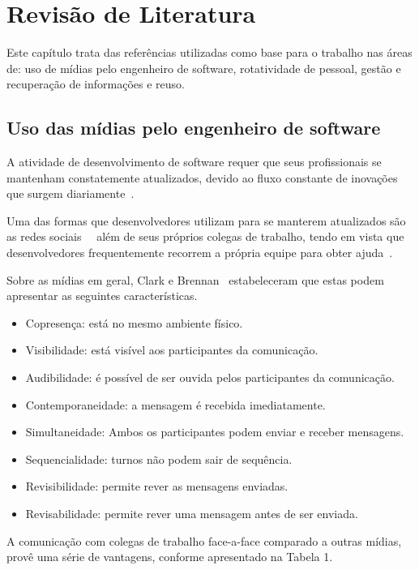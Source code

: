 \chapter{Revisão de Literatura}

Este capítulo trata das referências utilizadas como base para o trabalho nas áreas de: uso de mídias pelo engenheiro de software, rotatividade de pessoal, gestão e recuperação de informações e reuso.

\section{Uso das mídias pelo engenheiro de software}

A atividade de desenvolvimento de software requer que seus profissionais se mantenham constatemente atualizados, devido ao fluxo constante de inovações que surgem diariamente~\cite{Singer2014}.

Uma das formas que desenvolvedores utilizam para se manterem atualizados são as redes sociais~\cite{Treude2012}~\cite{Storey2014} além de seus próprios colegas de trabalho, tendo em vista que desenvolvedores frequentemente recorrem a própria equipe para obter ajuda~\cite{Weinberg1998}.

Sobre as mídias em geral, Clark e Brennan~\cite{Clark1991} estabeleceram que estas podem apresentar as seguintes características.

\begin{itemize}
  \item Copresença: está no mesmo ambiente físico.
  \item Visibilidade: está visível aos participantes da comunicação.
  \item Audibilidade: é possível de ser ouvida pelos participantes da comunicação.
  \item Contemporaneidade: a mensagem é recebida imediatamente.
  \item Simultaneidade: Ambos os participantes podem enviar e receber mensagens.
  \item Sequencialidade: turnos não podem sair de sequência.
  \item Revisibilidade: permite rever as mensagens enviadas.
  \item Revisabilidade: permite rever uma mensagem antes de ser enviada.
\end{itemize}

A comunicação com colegas de trabalho face-a-face comparado a outras mídias, provê uma série de vantagens, conforme apresentado na Tabela 1.

